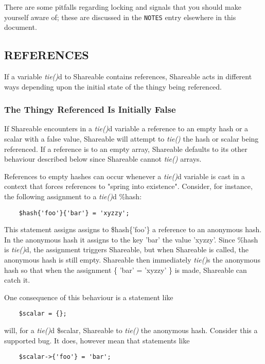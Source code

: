 There are some pitfalls regarding locking and signals that you should
make yourself aware of; these are discussed in the {\tt NOTES} entry elsewhere in this document.

\subsection*{REFERENCES}%

If a variable {\em tie()\/}d to Shareable contains references, Shareable acts
in different ways depending upon the initial state of the thingy being
referenced.

\subsubsection*{The Thingy Referenced Is Initially False}%

If Shareable encounters in a {\em tie()\/}d variable a reference to an empty
hash or a scalar with a false value, Shareable will attempt to {\em tie()\/} the
hash or scalar being referenced.  If a reference is to an empty array,
Shareable defaults to its other behaviour described below since
Shareable cannot {\em tie()\/} arrays.

References to empty hashes can occur whenever a {\em tie()\/}d variable is
cast in a context that forces references to "spring into existence".
Consider, for instance, the following assignment to a {\em tie()\/}d \%hash:
\begin{verbatim}
    $hash{'foo'}{'bar'} = 'xyzzy';
\end{verbatim}

This statement assigns assigns to \$hash\{'foo'\} a reference to an
anonymous hash.  In the anonymous hash it assigns to the key 'bar' the
value 'xyzzy'. Since \%hash is {\em tie()\/}d, the assignment triggers
Shareable, but when Shareable is called, the anonymous hash is still
empty.  Shareable then immediately {\em tie()\/}s the anonymous hash so that
when the assignment \{ 'bar' = 'xyzzy' \} is made, Shareable can catch
it.

One consequence of this behaviour is a statement like
\begin{verbatim}
    $scalar = {};
\end{verbatim}

will, for a {\em tie()\/}d \$scalar, Shareable to {\em tie()\/} the anonymous hash.
Consider this a supported bug.  It does, however mean that statements like
\begin{verbatim}
    $scalar->{'foo'} = 'bar';
\end{verbatim}

